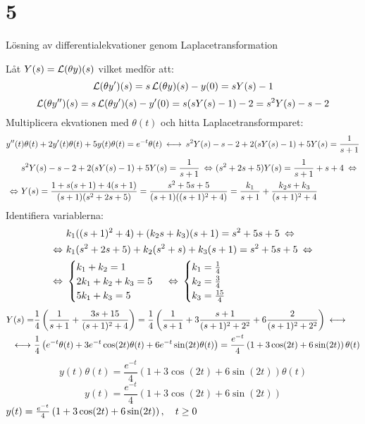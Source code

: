 \chapter{5}{Lösning av differentialekvationer genom Laplacetransformation}

\begin{task}{5.1}
	Låt $Y(s)=\operatorname{\mathcal{L}}(\theta y)(s)$ vilket medför att:
	\[\operatorname{\mathcal{L}}(\theta y')(s)=s\operatorname{\mathcal{L}}(\theta y)(s)-y(0)=sY(s)-1\]
	\[\operatorname{\mathcal{L}}(\theta y'')(s)=s\operatorname{\mathcal{L}}(\theta y')(s)-y'(0)=s(sY(s)-1)-2=s^2Y(s)-s-2\]
	Multiplicera ekvationen med $\theta(t)$ och hitta Laplacetransformparet:
	\[y''(t)\theta(t)+2y'(t)\theta(t)+5y(t)\theta(t)=e^{-t}\theta(t) \llra
	s^2Y(s)-s-2+2(sY(s)-1)+5Y(s)=\frac{1}{s+1}\]
	\begin{align*}
	&s^2Y(s)-s-2+2(sY(s)-1)+5Y(s)=\frac{1}{s+1} \lra
	(s^2+2s+5)Y(s)=\frac{1}{s+1}+s+4 \lra \\ \lra
	&Y(s)=
	\frac{1+s(s+1)+4(s+1)}{(s+1)(s^2+2s+5)}=
	\frac{s^2+5s+5}{(s+1)((s+1)^2+4)}=
	\frac{k_1}{s+1}+\frac{k_2s+k_3}{(s+1)^2+4}
	\end{align*}
	Identifiera variablerna:
	\begin{align*}
	&k_1((s+1)^2+4)+(k_2s+k_3)(s+1)=s^2+5s+5 \lra \\ \lra
	&k_1(s^2+2s+5)+k_2(s^2+s)+k_3(s+1)=s^2+5s+5 \lra \\ \lra
	&\begin{cases}
	k_1+k_2=1 \\
	2k_1+k_2+k_3=5 \\
	5k_1+k_3=5
	\end{cases} \lra
	\begin{cases}
	k_1=\frac{1}{4} \\
	k_2=\frac{3}{4} \\
	k_3=\frac{15}{4}
	\end{cases}
	\end{align*}
	\begin{align*}
	Y(s)=
	&\frac{1}{4}\left(\frac{1}{s+1}+\frac{3s+15}{(s+1)^2+4}\right)=
	\frac{1}{4}\left(\frac{1}{s+1}+3\frac{s+1}{(s+1)^2+2^2}+6\frac{2}{(s+1)^2+2^2}\right) \llra \\ \llra
	&\frac{1}{4}\left(e^{-t}\theta(t)+3e^{-t}\cos(2t)\theta(t)+6e^{-t}\sin(2t)\theta(t)\right)=
	\frac{e^{-t}}{4}\left(1+3\cos(2t)+6\sin(2t)\right)\theta(t)
	\end{align*}
	\[y(t)\theta(t)=\frac{e^{-t}}{4}\left(1+3\cos(2t)+6\sin(2t)\right)\theta(t)\]
	\[y(t)=\frac{e^{-t}}{4}\left(1+3\cos(2t)+6\sin(2t)\right)\]
	\ans $y(t)=\frac{e^{-t}}{4}\left(1+3\cos(2t)+6\sin(2t)\right), \quad t \ge 0$
\end{task}